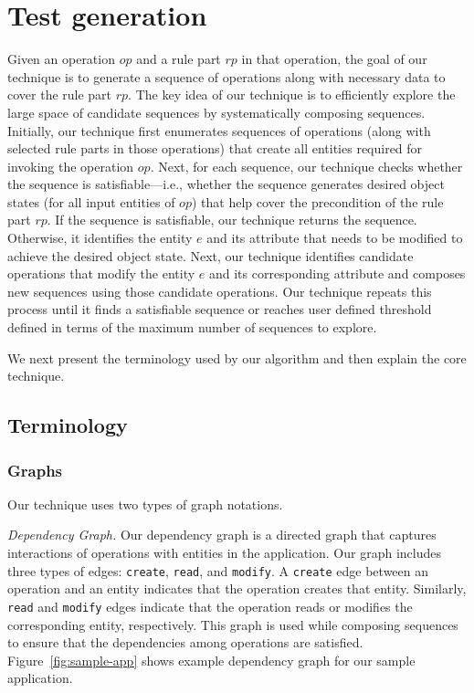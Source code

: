 \section{Test generation}

Given an operation $op$ and a rule part $rp$ in that operation, the goal 
of our technique is to generate a sequence of operations along with necessary data to
cover the rule part $rp$. The key idea of our technique is to efficiently
explore the large space of candidate sequences by systematically composing
sequences. Initially, our technique first enumerates
sequences of operations (along with selected rule parts in those operations) 
that create all entities required for invoking
the operation $op$. Next, for each sequence, our technique checks whether
the sequence is satisfiable---i.e., whether the sequence generates desired
object states (for all input entities of $op$) that help cover the
precondition of the rule part $rp$. If the sequence is satisfiable, our technique returns the sequence.
Otherwise, it identifies the entity $e$ and its attribute that needs to be modified
to achieve the desired object state. Next, our technique identifies candidate
operations that modify the entity $e$ and its corresponding attribute and composes
new sequences using those candidate operations. Our technique repeats this
process until it finds a satisfiable sequence or reaches user defined threshold
defined in terms of the maximum number of sequences to explore.

We next present the terminology used by our algorithm and then explain the core technique.

\subsection{Terminology}

\subsubsection{Graphs}
Our technique uses two types of graph notations.

\textit{Dependency Graph.} Our dependency graph is a directed graph that
captures interactions of operations with entities in the application.
Our graph includes three types of edges: {\tt create}, {\tt read}, and {\tt modify}.
A {\tt create} edge between an operation and an entity indicates that the operation
creates that entity. Similarly, {\tt read} and {\tt modify} edges indicate that
the operation reads or modifies the corresponding entity, respectively.
This graph is used while composing sequences to ensure that the dependencies among operations are satisfied.
Figure~\ref{fig:sample-app} shows example dependency graph for our sample application.

